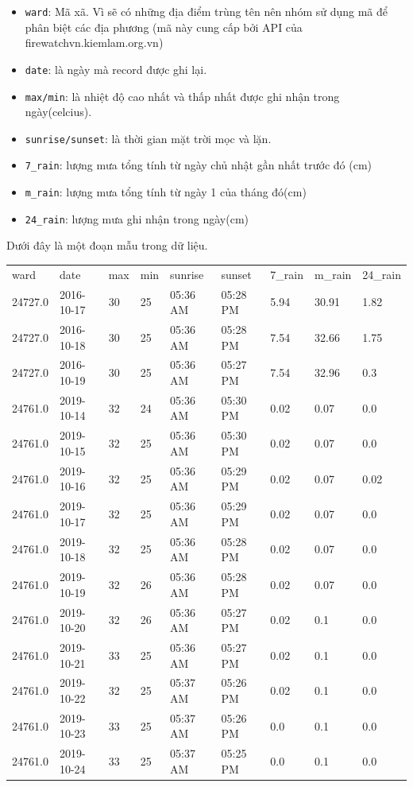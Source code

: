 \documentclass{article}
\begin{document}
\begin{itemize}
	\item \texttt{ward}: Mã xã. Vì sẽ có những địa điểm trùng tên nên nhóm sử dụng mã để phân biệt các địa phương (mã này cung cấp bởi API của firewatchvn.kiemlam.org.vn\cite{website:firewatch_administrative})
	\item \texttt{date}: là ngày mà record được ghi lại.
	\item \texttt{max/min}: là nhiệt độ cao nhất và thấp nhất được ghi nhận trong ngày(celcius).
	\item \texttt{sunrise/sunset}: là thời gian mặt trời mọc và lặn.
	\item \texttt{7\_rain}: lượng mưa tổng tính từ ngày chủ nhật gần nhất trước đó (cm)
	\item \texttt{m\_rain}: lượng mưa tổng tính từ ngày 1 của tháng đó(cm)
	\item \texttt{24\_rain}: lượng mưa ghi nhận trong ngày(cm)
\end{itemize}

Dưới đây là một đoạn mẫu trong dữ liệu.

\begin{table}[H]
	\begin{tabular}{lllllllll}
		ward    & date       & max & min & sunrise  & sunset   & 7\_rain & m\_rain & 24\_rain \\
		24727.0 & 2016-10-17 & 30  & 25  & 05:36 AM & 05:28 PM & 5.94    & 30.91   & 1.82     \\
		24727.0 & 2016-10-18 & 30  & 25  & 05:36 AM & 05:28 PM & 7.54    & 32.66   & 1.75     \\
		24727.0 & 2016-10-19 & 30  & 25  & 05:36 AM & 05:27 PM & 7.54    & 32.96   & 0.3      \\
		24761.0 & 2019-10-14 & 32  & 24  & 05:36 AM & 05:30 PM & 0.02    & 0.07    & 0.0      \\
		24761.0 & 2019-10-15 & 32  & 25  & 05:36 AM & 05:30 PM & 0.02    & 0.07    & 0.0      \\
		24761.0 & 2019-10-16 & 32  & 25  & 05:36 AM & 05:29 PM & 0.02    & 0.07    & 0.02     \\
		24761.0 & 2019-10-17 & 32  & 25  & 05:36 AM & 05:29 PM & 0.02    & 0.07    & 0.0      \\
		24761.0 & 2019-10-18 & 32  & 25  & 05:36 AM & 05:28 PM & 0.02    & 0.07    & 0.0      \\
		24761.0 & 2019-10-19 & 32  & 26  & 05:36 AM & 05:28 PM & 0.02    & 0.07    & 0.0      \\
		24761.0 & 2019-10-20 & 32  & 26  & 05:36 AM & 05:27 PM & 0.02    & 0.1     & 0.0      \\
		24761.0 & 2019-10-21 & 33  & 25  & 05:36 AM & 05:27 PM & 0.02    & 0.1     & 0.0      \\
		24761.0 & 2019-10-22 & 32  & 25  & 05:37 AM & 05:26 PM & 0.02    & 0.1     & 0.0      \\
		24761.0 & 2019-10-23 & 33  & 25  & 05:37 AM & 05:26 PM & 0.0     & 0.1     & 0.0      \\
		24761.0 & 2019-10-24 & 33  & 25  & 05:37 AM & 05:25 PM & 0.0     & 0.1     & 0.0
	\end{tabular}
\end{table}
\end{document}

